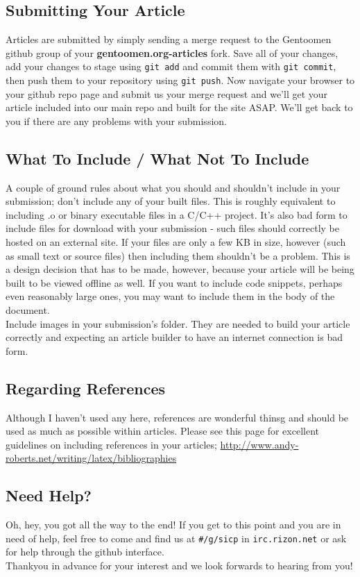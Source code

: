 \documentclass{article}
\begin{document}
\subsection{Submitting Your Article}
  Articles are submitted by simply sending a merge request to the Gentoomen github group of your \textbf{gentoomen.org-articles} fork. Save all of your changes, add your changes to stage using \texttt{git add} and commit them with \texttt{git commit}, then push them to your repository using \texttt{git push}. Now navigate your browser to your github repo page and submit us your merge request and we'll get your article included into our main repo and built for the site ASAP. We'll get back to you if there are any problems with your submission.
\subsection{What To Include / What Not To Include}
  A couple of ground rules about what you should and shouldn't include in your submission; don't include any of your built files. This is roughly equivalent to including .o or binary executable files in a C/C++ project. It's also bad form to include files for download with your submission - such files should correctly be hosted on an external site. If your files are only a few KB in size, however (such as small text or source files) then including them shouldn't be a problem. This is a design decision that has to be made, however, because your article will be being built to be viewed offline as well. If you want to include code snippets, perhaps even reasonably large ones, you may want to include them in the body of the document. \\
  Include images in your submission's folder. They are needed to build your article correctly and expecting an article builder to have an internet connection is bad form.
\subsection{Regarding References}
  Although I haven't used any here, references are wonderful thinsg and should be used as much as possible within articles. Please see this page for excellent guidelines on including references in your articles; \url{http://www.andy-roberts.net/writing/latex/bibliographies}
\subsection{Need Help?}
  Oh, hey, you got all the way to the end! If you get to this point and you are in need of help, feel free to come and find us at \texttt{\#/g/sicp} in \texttt{irc.rizon.net} or ask for help through the github interface. \\
  Thankyou in advance for your interest and we look forwards to hearing from you!
\end{document}
